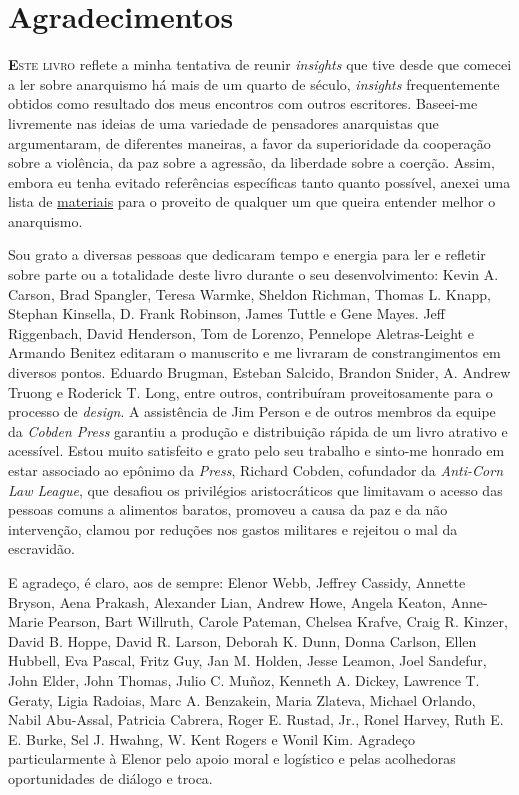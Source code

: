 
\chapter{Agradecimentos}

\lettrine[lines=2]{\textcolor{LettrineColor}{\textbf{E}}}{ste livro} reflete a minha tentativa de reunir \emph{insights} que tive desde que comecei a ler sobre anarquismo há mais de um quarto de século, \emph{insights} frequentemente obtidos como resultado dos meus encontros com outros escritores. Baseei-me livremente nas ideias de uma variedade de pensadores anarquistas que argumentaram, de diferentes maneiras, a favor da superioridade da cooperação sobre a violência, da paz sobre a agressão, da liberdade sobre a coerção. Assim, embora eu tenha evitado referências específicas tanto quanto possível, anexei uma lista de \hyperref[chap:rec]{materiais} para o proveito de qualquer um que queira entender melhor o anarquismo.

Sou grato a diversas pessoas que dedicaram tempo e energia para ler e refletir sobre parte ou a totalidade deste livro durante o seu desenvolvimento: Kevin A. Carson, Brad Spangler, Teresa Warmke, Sheldon Richman, Thomas L. Knapp, Stephan Kinsella, D. Frank Robinson, James Tuttle e Gene Mayes. Jeff Riggenbach, David Henderson, Tom de Lorenzo, Pennelope Aletras-Leight e Armando Benitez editaram o manuscrito e me livraram de constrangimentos em diversos pontos. Eduardo Brugman, Esteban Salcido, Brandon Snider, A. Andrew Truong e Roderick T. Long, entre outros, contribuíram proveitosamente para o processo de \emph{design}. A assistência de Jim Person e de outros membros da equipe da \emph{Cobden Press} garantiu a produção e distribuição rápida de um livro atrativo e acessível. Estou muito satisfeito e grato pelo seu trabalho e sinto-me honrado em estar associado ao epônimo da \emph{Press}, Richard Cobden, cofundador da \emph{Anti-Corn Law League}, que desafiou os privilégios aristocráticos que limitavam o acesso das pessoas comuns a alimentos baratos, promoveu a causa da paz e da não intervenção, clamou por reduções nos gastos militares e rejeitou o mal da escravidão.

E agradeço, é claro, aos de sempre: Elenor Webb, Jeffrey Cassidy, Annette Bryson, Aena Prakash, Alexander Lian, Andrew Howe, Angela Keaton, Anne-Marie Pearson, Bart Willruth, Carole Pateman, Chelsea Krafve, Craig R. Kinzer, David B. Hoppe, David R. Larson, Deborah K. Dunn, Donna Carlson, Ellen Hubbell, Eva Pascal, Fritz Guy, Jan M. Holden, Jesse Leamon, Joel Sandefur, John Elder, John Thomas, Julio C. Muñoz, Kenneth A. Dickey, Lawrence T. Geraty, Ligia Radoias, Marc A. Benzakein, Maria Zlateva, Michael Orlando, Nabil Abu-Assal, Patricia Cabrera, Roger E. Rustad, Jr., Ronel Harvey, Ruth E. E. Burke, Sel J. Hwahng, W. Kent Rogers e Wonil Kim. Agradeço particularmente à Elenor pelo apoio moral e logístico e pelas acolhedoras oportunidades de diálogo e troca.

